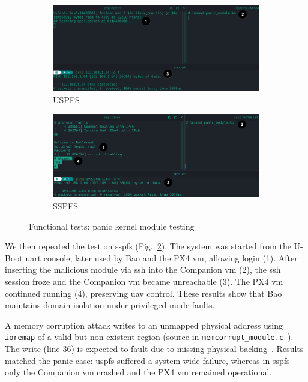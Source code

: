 \begin{figure}[!hbt]
  \centering
  \begin{subfigure}[t]{0.8\textwidth}
    \centering
    \includegraphics[width=1.0\textwidth]{./img/png/kmod-panic-test-annot}
    \caption{USPFS}%
    \label{fig:kmod-panic-test-uspfs}
  \end{subfigure}
  \begin{subfigure}[t]{0.8\textwidth}
    \centering
    \includegraphics[width=\linewidth]{./img/png/kmod-panic-test-bao-annot}
    \caption{SSPFS}%
    \label{fig:kmod-panic-test-sspfs}
  \end{subfigure}
  \caption{Functional tests: panic kernel module testing}
  \label{fig:kmod-panic-test}
\end{figure}

We then repeated the test on \gls{sspfs}
(Fig.~\ref{fig:kmod-panic-test-sspfs}). The system was started from the U-Boot
\gls{uart} console, later used by Bao and the PX4 \gls{vm}, allowing login
(1). After inserting the malicious module via \gls{ssh} into the Companion \gls{vm}
(2), the \gls{ssh} session froze and the Companion \gls{vm} became unreachable
(3). The PX4 \gls{vm} continued running (4), preserving \gls{uav} control. These
results show that Bao maintains domain isolation under privileged-mode faults.

A memory corruption attack writes to an unmapped physical address using \lstinline{ioremap} of a valid but non-existent region (source in \lstinline{memcorrupt_module.c}~\cite{thesis-sw-github}). The write (line 36) is expected to fault due to missing physical backing~\cite{iomapLinux}. Results matched the panic case: \gls{uspfs} suffered a system-wide failure, whereas in \gls{sspfs} only the Companion \gls{vm} crashed and the PX4 \gls{vm} remained operational.

